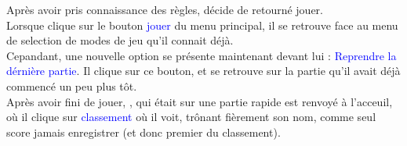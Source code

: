 {\begin{minipage}{15cm}
		Après avoir pris connaissance des règles, \perso décide de retourné jouer.\\
		Lorsque \perso clique sur le bouton \textcolor{blue}{jouer} du menu principal, il se retrouve face au menu de selection de modes de jeu qu'il connait déjà.\\
		Cepandant, une nouvelle option se présente maintenant devant lui : \textcolor{blue}{Reprendre la dérnière partie}.
		Il clique sur ce bouton, et se retrouve sur la partie qu'il avait déjà commencé un peu plus tôt.\\

		Après avoir fini de jouer, \perso, qui était sur une partie rapide est renvoyé à l'acceuil, où il clique sur \textcolor{blue}{classement} où il voit, trônant fièrement son nom, comme seul score jamais enregistrer (et donc premier du classement).
\end{minipage}	}
